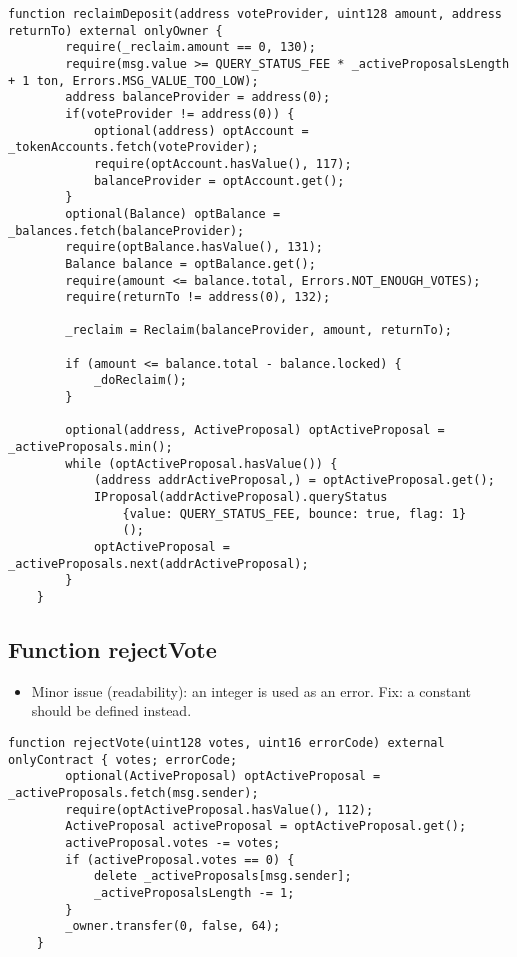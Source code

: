 \begin{lstlisting}[firstnumber=118]
    function reclaimDeposit(address voteProvider, uint128 amount, address returnTo) external onlyOwner {
        require(_reclaim.amount == 0, 130);
        require(msg.value >= QUERY_STATUS_FEE * _activeProposalsLength + 1 ton, Errors.MSG_VALUE_TOO_LOW);
        address balanceProvider = address(0);
        if(voteProvider != address(0)) {
            optional(address) optAccount = _tokenAccounts.fetch(voteProvider);
            require(optAccount.hasValue(), 117);
            balanceProvider = optAccount.get();
        }
        optional(Balance) optBalance = _balances.fetch(balanceProvider);
        require(optBalance.hasValue(), 131);
        Balance balance = optBalance.get();
        require(amount <= balance.total, Errors.NOT_ENOUGH_VOTES);
        require(returnTo != address(0), 132);

        _reclaim = Reclaim(balanceProvider, amount, returnTo);

        if (amount <= balance.total - balance.locked) {
            _doReclaim();
        }

        optional(address, ActiveProposal) optActiveProposal = _activeProposals.min();
        while (optActiveProposal.hasValue()) {
            (address addrActiveProposal,) = optActiveProposal.get();
            IProposal(addrActiveProposal).queryStatus
                {value: QUERY_STATUS_FEE, bounce: true, flag: 1}
                ();
            optActiveProposal = _activeProposals.next(addrActiveProposal);
        }
    }
\end{lstlisting}

\subsection{Function rejectVote}

\begin{itemize}
\item Minor issue (readability): an integer is used as an error. Fix:
  a constant should be defined instead.
\end{itemize}

\begin{lstlisting}[firstnumber=106]
    function rejectVote(uint128 votes, uint16 errorCode) external onlyContract { votes; errorCode;
        optional(ActiveProposal) optActiveProposal = _activeProposals.fetch(msg.sender);
        require(optActiveProposal.hasValue(), 112);
        ActiveProposal activeProposal = optActiveProposal.get();
        activeProposal.votes -= votes;
        if (activeProposal.votes == 0) {
            delete _activeProposals[msg.sender];
            _activeProposalsLength -= 1;
        }
        _owner.transfer(0, false, 64);
    }
\end{lstlisting}

